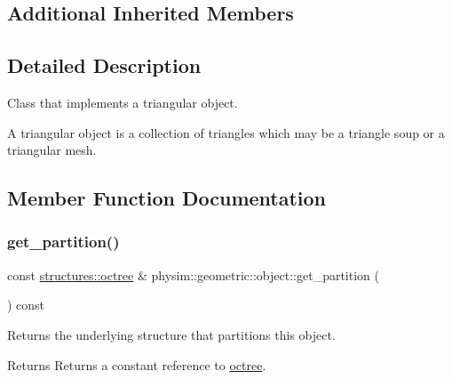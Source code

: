 \subsection*{Additional Inherited Members}


\subsection{Detailed Description}
Class that implements a triangular object. 

A triangular object is a collection of triangles which may be a triangle soup or a triangular mesh. 

\subsection{Member Function Documentation}
\mbox{\label{classphysim_1_1geometric_1_1object_a618389ab9b30e9dea436165a6920b389}} 
\subsubsection{\texorpdfstring{get\+\_\+partition()}{get\_partition()}}
{\footnotesize\ttfamily const \hyperlink{classphysim_1_1structures_1_1octree}{structures\+::octree} \& physim\+::geometric\+::object\+::get\+\_\+partition (\begin{DoxyParamCaption}{ }\end{DoxyParamCaption}) const}



Returns the underlying structure that partitions this object. 

\begin{DoxyReturn}{Returns}
Returns a constant reference to \hyperlink{classphysim_1_1geometric_1_1object_a4f588a490ec8a223b5229c6e7dba5295}{octree}. 
\end{DoxyReturn}
\mbox{\label{classphysim_1_1geometric_1_1object_a4bdf008b324fe8e1e1b83dbc47b5e897}} 
